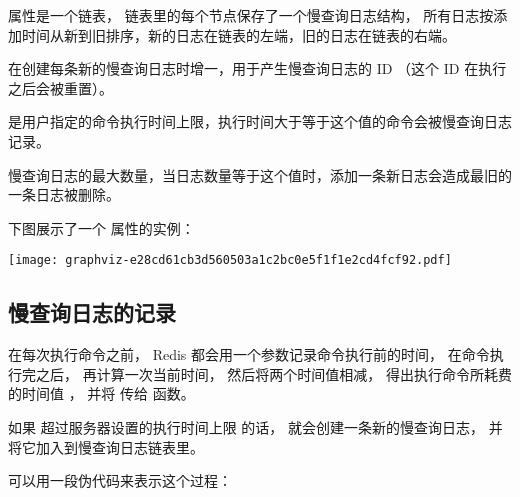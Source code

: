 \documentclass[a4paper,11pt,english]{sphinxmanual}
\begin{document}
 属性是一个链表，
链表里的每个节点保存了一个慢查询日志结构，
所有日志按添加时间从新到旧排序，新的日志在链表的左端，旧的日志在链表的右端。

 在创建每条新的慢查询日志时增一，用于产生慢查询日志的 ID （这个 ID 在执行  之后会被重置）。

 是用户指定的命令执行时间上限，执行时间大于等于这个值的命令会被慢查询日志记录。

 慢查询日志的最大数量，当日志数量等于这个值时，添加一条新日志会造成最旧的一条日志被删除。

下图展示了一个  属性的实例：

\texttt{[image: graphviz-e28cd61cb3d560503a1c2bc0e5f1f1e2cd4fcf92.pdf]}


\subsection{慢查询日志的记录}
\label{feature/slowlog:id3}
在每次执行命令之前，
Redis 都会用一个参数记录命令执行前的时间，
在命令执行完之后，
再计算一次当前时间，
然后将两个时间值相减，
得出执行命令所耗费的时间值  ，
并将  传给  函数。

如果  超过服务器设置的执行时间上限  的话，
 就会创建一条新的慢查询日志，
并将它加入到慢查询日志链表里。

可以用一段伪代码来表示这个过程：
\end{document}
